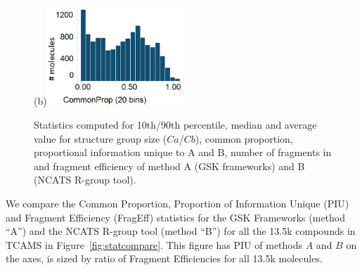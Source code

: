 \documentclass[journal=jacsat,manuscript=article]{achemso}
\newcommand*\fref[1]{Figure~\ref{fig:#1}}
\begin{document}
\begin{figure}
  \begin{minipage}[c]{\linewidth}
\vspace{0pt}
\centering
{}
(b)\includegraphics[width=2in]{fig/CP_TCAMS_GSKFW_RGT.png}
  \end{minipage}
  \caption{Statistics computed for 10th/90th percentile, median and average value for structure group size ($Ca$/$Cb$), common proportion, proportional information unique to A and B, number of fragments in and fragment efficiency of method A (GSK frameworks) and B (NCATS R-group tool).}
\label{fig:statcomparetable}
\end{figure}


We compare the Common Proportion, Proportion of Information Unique (PIU) and Fragment Efficiency (FragEff) statistics for the GSK Frameworks (method ``A'') and the NCATS R-group tool (method ``B'') for all the 13.5k compounds in TCAMS in \fref{statcompare}.  This figure has PIU of methods $A$ and $B$ on the axes, is sized by ratio of Fragment Efficiencies for all 13.5k molecules.   
\end{document}
